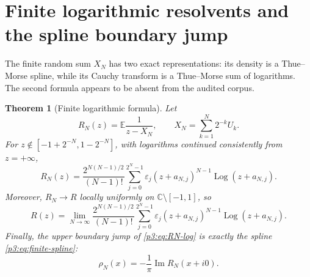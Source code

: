 \documentclass[11pt]{article}
\newtheorem{theorem}{Theorem}[section]
\theoremstyle{definition}
\theoremstyle{remark}
\newcommand{\C}{\mathbb C}
\newcommand{\E}{\mathbb E}
\newcommand{\eps}{\varepsilon}
\newcommand{\Log}{\operatorname{Log}}
\begin{document}
\section{Finite logarithmic resolvents and the spline boundary jump}

The finite random sum \(X_N\) has two exact representations: its density is a
Thue--Morse spline, while its Cauchy transform is a Thue--Morse sum of logarithms.  The
second formula appears to be absent from the audited corpus.

\begin{theorem}[Finite logarithmic formula]\label{p3:thm:finite-log}
Let
\[
 R_N(z)=\E\frac1{z-X_N},
 \qquad X_N=\sum_{k=1}^{N}2^{-k}U_k.
\]
For \(z\notin[-1+2^{-N},1-2^{-N}]\), with logarithms continued consistently from
\(z=+\infty\),
\begin{equation}
 \boxed{
 R_N(z)=\frac{2^{N(N-1)/2}}{(N-1)!}
 \sum_{j=0}^{2^N-1}\eps_j
 (z+a_{N,j})^{N-1}\Log(z+a_{N,j}).
 }                                                           \label{p3:eq:RN-log}
\end{equation}
Moreover, \(R_N\to R\) locally uniformly on \(\C\setminus[-1,1]\), so
\begin{equation}
 R(z)=\lim_{N\to\infty}\frac{2^{N(N-1)/2}}{(N-1)!}
 \sum_{j=0}^{2^N-1}\eps_j
 (z+a_{N,j})^{N-1}\Log(z+a_{N,j}).                           \label{p3:eq:R-log-limit}
\end{equation}
Finally, the upper boundary jump of \eqref{p3:eq:RN-log} is exactly the spline
\eqref{p3:eq:finite-spline}:
\begin{equation}
 \rho_N(x)=-\frac1\pi\operatorname{Im}R_N(x+i0).
                                                                    \label{p3:eq:RN-boundary}
\end{equation}
\end{theorem}
\end{document}
